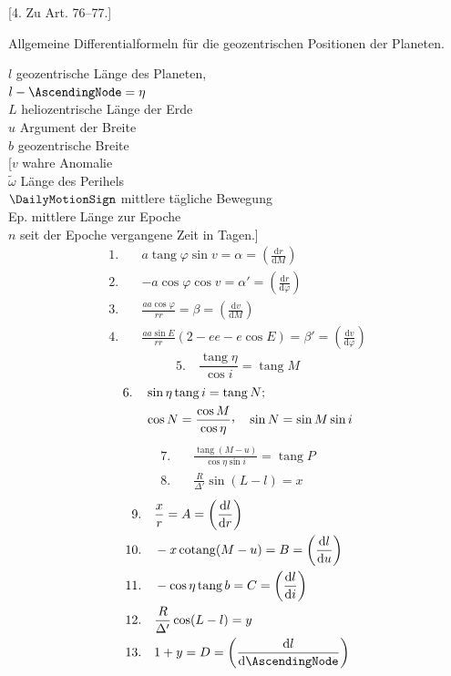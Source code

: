 \begin{center}
[4. Zu Art. 76–77.]\par
Allgemeine Differentialformeln für die geozentrischen Positionen der Planeten.
\end{center}
\noindent
\(l\) geozentrische Länge des Planeten,\\
\hfill \(l-\AscendingNode=\eta\)\\
\(L\) heliozentrische Länge der Erde\\
\(u\) Argument der Breite\\
\(b\) geozentrische Breite\\{}
[\(v\) wahre Anomalie\\
\(\tilde\omega\) Länge des Perihels\\
\(\DailyMotionSign\) mittlere tägliche Bewegung\\
Ep. mittlere Länge zur Epoche\\
\(n\) seit der Epoche vergangene Zeit in Tagen.]
\[
\begin{aligned}
1.\quad&a\operatorname{tang}\varphi\sin v=\alpha=\left(\frac{\mathrm{d}r}{\mathrm{d}M}\right)\\
2.\quad&-a\cos\varphi\cos v=\alpha'=\left(\frac{\mathrm{d}r}{\mathrm{d}\varphi}\right)\\
3.\quad&\frac{aa\cos\varphi}{rr}=\beta=\left(\frac{\mathrm{d}v}{\mathrm{d}M}\right)\\
4.\quad&\frac{aa\sin E}{rr}(2-ee-e\cos E)=\beta'=\left(\frac{\mathrm{d}v}{\mathrm{d}\varphi}\right)
\end{aligned}
\]
\[
5.\quad\frac{\operatorname{tang}\eta}{\cos i}=\operatorname{tang}M
\]
\[
\begin{aligned}
6.\quad&\sin\eta\operatorname{tang}i=\operatorname{tang}N;\\
&\cos N=\frac{\cos M}{\cos\eta}\mathpunct{\raisebox{.45ex}{,}}\quad\sin N=\sin M\sin i
\end{aligned}
\]
\[
\begin{aligned}
7.\quad&\frac{\operatorname{tang}(M-u)}{\cos\eta\sin i}=\operatorname{tang}P\\
8.\quad&\frac{R}{\Delta'}\sin(L-l)=x
\end{aligned}
\]
\[
\begin{aligned}
9.\quad&\frac{x}{r}=A=\left(\frac{\mathrm{d}l}{\mathrm{d}r}\right)\\
10.\quad&-x\operatorname{cotang}(M-u)=B=\left(\frac{\mathrm{d}l}{\mathrm{d}u}\right)\\
11.\quad&-\cos\eta\operatorname{tang}b=C=\left(\frac{\mathrm{d}l}{\mathrm{d}i}\right)\\
12.\quad&\frac{R}{\Delta'}\cos(L-l)=y\\
13.\quad&1+y=D=\left(\frac{\mathrm{d}l}{\mathrm{d}\AscendingNode}\right)
\end{aligned}
\]
